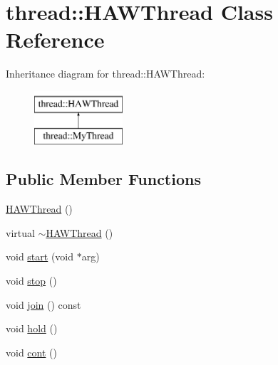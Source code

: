 \hypertarget{classthread_1_1HAWThread}{\section{thread\-:\-:H\-A\-W\-Thread Class Reference}
\label{classthread_1_1HAWThread}
}
Inheritance diagram for thread\-:\-:H\-A\-W\-Thread\-:\begin{figure}[H]
\begin{center}
\leavevmode
\includegraphics[height=2.000000cm]{classthread_1_1HAWThread}
\end{center}
\end{figure}
\subsection*{Public Member Functions}
\begin{DoxyCompactItemize}
\item 
\hyperlink{classthread_1_1HAWThread_a7ae3280c8aee6ae6536c736a20d92e8d}{H\-A\-W\-Thread} ()
\item 
virtual \hyperlink{classthread_1_1HAWThread_a84706dda23aa384a43ced901381e795b}{$\sim$\-H\-A\-W\-Thread} ()
\item 
void \hyperlink{classthread_1_1HAWThread_ae08d268c337511a1e67fbbeefcb1e89d}{start} (void $\ast$arg)
\item 
void \hyperlink{classthread_1_1HAWThread_ae8a89c83fd7e9b9a712c19f636ab2638}{stop} ()
\item 
void \hyperlink{classthread_1_1HAWThread_a4732efa3445c499f1723971acc07863f}{join} () const 
\item 
void \hyperlink{classthread_1_1HAWThread_a18f2a0cc61833e98b18e56ea541fa38b}{hold} ()
\item 
void \hyperlink{classthread_1_1HAWThread_a4c480261e3236c90c8de73be55650ba4}{cont} ()
\end{DoxyCompactItemize}
